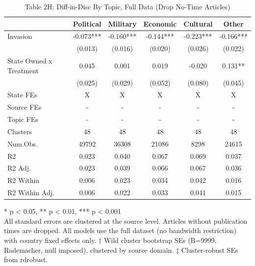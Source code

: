 \begin{table}[!t]
\caption{Table 2H: Diff-in-Disc By Topic, Full Data (Drop No-Time Articles)} 
\fontsize{12.0pt}{14.4pt}\selectfont
\begin{tabular*}{\linewidth}{@{\extracolsep{\fill}}lccccc}
\toprule
  & Political & Military & Economic & Cultural & Other \\ 
\midrule\addlinespace[2.5pt]
Invasion & -0.073*** & -0.160*** & -0.144*** & -0.223*** & -0.166*** \\ 
 & (0.013) & (0.016) & (0.020) & (0.026) & (0.022) \\ 
State Owned x Treatment & 0.045 & 0.001 & 0.019 & -0.020 & 0.131** \\ 
{} & {(0.025)} & {(0.029)} & {(0.052)} & {(0.080)} & {(0.045)} \\ 
State FEs & X & X & X & X & X \\ 
Source FEs & - & - & - & - & - \\ 
Topic FEs & - & - & - & - & - \\ 
Clusters & 48 & 48 & 48 & 48 & 48 \\ 
Num.Obs. & 49792 & 36308 & 21086 & 8298 & 24615 \\ 
R2 & 0.023 & 0.040 & 0.067 & 0.069 & 0.037 \\ 
R2 Adj. & 0.023 & 0.039 & 0.066 & 0.067 & 0.036 \\ 
R2 Within & 0.006 & 0.023 & 0.034 & 0.042 & 0.016 \\ 
R2 Within Adj. & 0.006 & 0.022 & 0.033 & 0.041 & 0.015 \\ 
\bottomrule
\end{tabular*}
\begin{minipage}{\linewidth}
* p < 0.05, ** p < 0.01, *** p < 0.001\\
All standard errors are clustered at the source level. Articles without
publication times are dropped. All models use the full dataset (no bandwidth
restriction) with country fixed effects only. † Wild cluster bootstrap SEs
(B=9999, Rademacher, null imposed), clustered by source domain. ‡ Cluster-robust
SEs from rdrobust.\\
\end{minipage}
\end{table}

